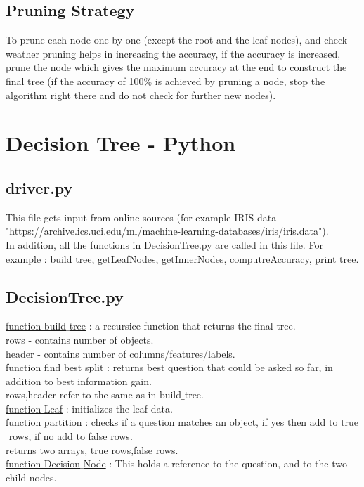 \documentclass[conference,compsoc]{IEEEtran}
\begin{document}
\subsection{Pruning Strategy}
To prune each node one by one (except the root and the leaf nodes), and check weather pruning helps in increasing the accuracy, if the accuracy is increased, prune the node which gives the maximum accuracy at the end to construct the final tree (if the accuracy of 100\% is achieved by pruning a node, stop the algorithm right there and do not check for further new nodes).

\section{Decision Tree - Python}
\subsection{driver.py}
This file gets input from online sources (for example IRIS data "https://archive.ics.uci.edu/ml/machine-learning-databases/iris/iris.data"). 
\\ In addition, all the functions in DecisionTree.py are called in this file. For example : build$\_$tree, getLeafNodes, getInnerNodes, computreAccuracy, print$\_$tree.


\subsection{DecisionTree.py}
\underline{function build$\_$tree} : a recursice function that returns the final tree.
\\rows - contains number of objects.
\\header - contains number of columns/features/labels.
\\\underline{function find$\_$best$\_$split} : returns best question that could be asked so far, in addition to best information gain.
\\rows,header refer to the same as in build$\_$tree.
\\\underline{function Leaf} : initializes the leaf data.
\\\underline{function partition} : checks if a question matches an object, if yes then add to true$\_$rows, if no add to false$\_$rows.
\\ returns two arrays, true$\_$rows,false$\_$rows.
\\\underline{function Decision$\_$Node} : This holds a reference to the question, and to the two child nodes.
\end{document}
